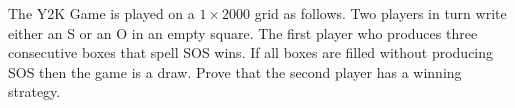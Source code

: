 The Y2K Game is played on a $1 \times 2000$ grid as follows. Two players in turn write either an S or an O in an empty square. The first player who produces three consecutive boxes that spell SOS wins. If all boxes are filled without producing SOS then the game is a draw. Prove that the second player has a winning strategy.